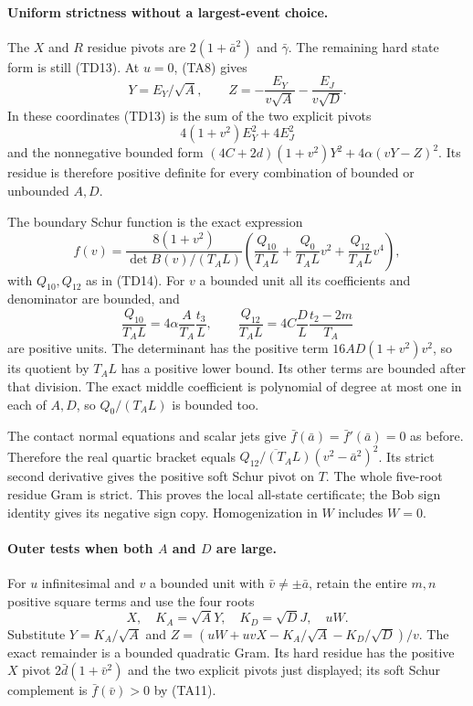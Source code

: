 \paragraph{Uniform strictness without a largest-event choice.}
The $X$ and $R$ residue pivots are $2(1+\bar a^2)$ and
$\bar\gamma$. The remaining hard state form is still (TD13).
At $u=0$, (TA8) gives
\[
 Y=E_Y/\sqrt A,\qquad
 Z=-\frac{E_Y}{v\sqrt A}-\frac{E_J}{v\sqrt D}.
\]
In these coordinates (TD13) is the sum of the two explicit pivots
\[
 4(1+v^2)E_Y^2+4E_J^2
\]
and the nonnegative bounded form
$(4C+2d)(1+v^2)Y^2+4\alpha(vY-Z)^2$.
Its residue is therefore positive definite for every combination of
bounded or unbounded $A,D$.

The boundary Schur function is the exact expression
\[
 f(v)=\frac{8(1+v^2)}{\det B(v)/(T_A L)}
 \left(\frac{Q_{10}}{T_A L}+
       \frac{Q_0}{T_A L}v^2+\frac{Q_{12}}{T_A L}v^4\right),     \tag{TA11}
\]
with $Q_{10},Q_{12}$ as in (TD14). For $v$ a bounded unit all its
coefficients and denominator are bounded, and
\[
 \frac{Q_{10}}{T_A L}=4\alpha\frac A{T_A}\frac{t_3}{L},\qquad
 \frac{Q_{12}}{T_A L}=4C\frac D L\frac{t_2-2m}{T_A}
\]
are positive units. The determinant has the positive term
$16AD(1+v^2)v^2$, so its quotient by $T_A L$ has a positive lower
bound. Its other terms are bounded after that division.
The exact middle coefficient is polynomial of degree at most one
in each of $A,D$, so $Q_0/(T_A L)$ is bounded too.

The contact normal equations and scalar jets give
$\bar f(\bar a)=\bar f'(\bar a)=0$ as before. Therefore the real
quartic bracket equals
$\overline{Q_{12}/(T_A L)}(v^2-\bar a^2)^2$.
Its strict second derivative gives the positive soft Schur pivot on
$T$. The whole five-root residue Gram is strict. This proves the
local all-state certificate; the Bob sign identity gives its negative
sign copy. Homogenization in $W$ includes $W=0$.

\paragraph{Outer tests when both $A$ and $D$ are large.}
For $u$ infinitesimal and $v$ a bounded unit with
$\bar v\ne\pm\bar a$, retain the entire $m,n$ positive square terms and use the
four roots
\[
 X,\quad K_A=\sqrt A Y,\quad K_D=\sqrt D J,\quad uW.
\]
Substitute $Y=K_A/\sqrt A$ and
$Z=(uW+uvX-K_A/\sqrt A-K_D/\sqrt D)/v$.
The exact remainder is a bounded quadratic Gram. Its hard residue
has the positive $X$ pivot $2\bar d(1+\bar v^2)$ and the two
explicit pivots just displayed; its soft Schur complement is
$\bar f(\bar v)>0$ by (TA11).

